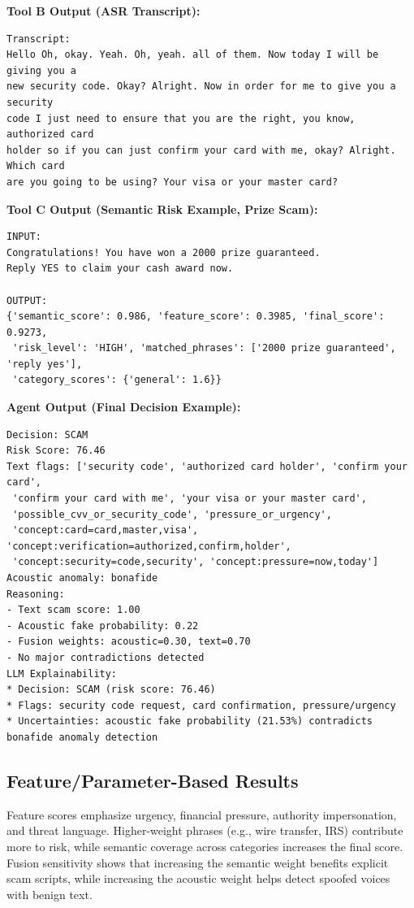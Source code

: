 \documentclass[11pt,a4paper]{article}
\begin{document}
\textbf{Tool B Output (ASR Transcript):}
\begin{verbatim}
Transcript:
Hello Oh, okay. Yeah. Oh, yeah. all of them. Now today I will be giving you a
new security code. Okay? Alright. Now in order for me to give you a security
code I just need to ensure that you are the right, you know, authorized card
holder so if you can just confirm your card with me, okay? Alright. Which card
are you going to be using? Your visa or your master card?
\end{verbatim}

\textbf{Tool C Output (Semantic Risk Example, Prize Scam):}
\begin{verbatim}
INPUT:
Congratulations! You have won a 2000 prize guaranteed.
Reply YES to claim your cash award now.

OUTPUT:
{'semantic_score': 0.986, 'feature_score': 0.3985, 'final_score': 0.9273,
 'risk_level': 'HIGH', 'matched_phrases': ['2000 prize guaranteed', 'reply yes'],
 'category_scores': {'general': 1.6}}
\end{verbatim}

\textbf{Agent Output (Final Decision Example):}
\begin{verbatim}
Decision: SCAM
Risk Score: 76.46
Text flags: ['security code', 'authorized card holder', 'confirm your card',
 'confirm your card with me', 'your visa or your master card',
 'possible_cvv_or_security_code', 'pressure_or_urgency',
 'concept:card=card,master,visa', 'concept:verification=authorized,confirm,holder',
 'concept:security=code,security', 'concept:pressure=now,today']
Acoustic anomaly: bonafide
Reasoning:
- Text scam score: 1.00
- Acoustic fake probability: 0.22
- Fusion weights: acoustic=0.30, text=0.70
- No major contradictions detected
LLM Explainability:
* Decision: SCAM (risk score: 76.46)
* Flags: security code request, card confirmation, pressure/urgency
* Uncertainties: acoustic fake probability (21.53%) contradicts bonafide anomaly detection
\end{verbatim}

\subsection{Feature/Parameter-Based Results}
Feature scores emphasize urgency, financial pressure, authority impersonation, and threat language. Higher-weight phrases (e.g., wire transfer, IRS) contribute more to risk, while semantic coverage across categories increases the final score. Fusion sensitivity shows that increasing the semantic weight benefits explicit scam scripts, while increasing the acoustic weight helps detect spoofed voices with benign text.
\end{document}
